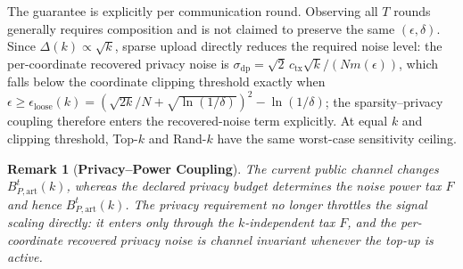 \documentclass[journal]{IEEEtran}
\newtheorem{remark}{Remark}
\begin{document}
The guarantee is explicitly per communication round. Observing all $T$ rounds generally requires composition and is not claimed to preserve the same $(\epsilon,\delta)$. Since $\Delta(k)\propto\sqrt k$, sparse upload directly reduces the required noise level: the per-coordinate recovered privacy noise is $\sigma_{\mathrm{dp}}=\sqrt2\,c_{\mathrm{tx}}\sqrt k/(Nm(\epsilon))$, which falls below the coordinate clipping threshold exactly when $\epsilon\ge\epsilon_{\mathrm{loose}}(k)=(\sqrt{2k}/N+\sqrt{\ln(1/\delta)})^2-\ln(1/\delta)$; the sparsity--privacy coupling therefore enters the recovered-noise term explicitly. At equal $k$ and clipping threshold, Top-$k$ and Rand-$k$ have the same worst-case sensitivity ceiling.

\begin{remark}[\bf Privacy--Power Coupling]
The current public channel changes $B_{P,\mathrm{art}}^t(k)$, whereas the declared privacy budget determines the noise power tax $F$ and hence $B_{P,\mathrm{art}}^t(k)$. The privacy requirement no longer throttles the signal scaling directly: it enters only through the $k$-independent tax $F$, and the per-coordinate recovered privacy noise is channel invariant whenever the top-up is active.
\end{remark}
\end{document}
